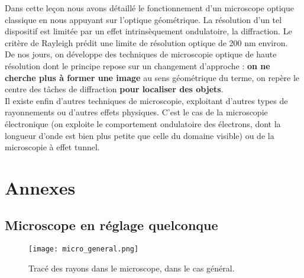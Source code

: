\documentclass[11pt,a4paper]{report}
\begin{document}
Dans cette leçon nous avons détaillé le fonctionnement d'un microscope optique classique en nous appuyant sur l'optique géométrique. La résolution d'un tel dispositif est limitée par un effet intrinsèquement ondulatoire, la diffraction. Le critère de Rayleigh prédit une limite de résolution optique de 200 nm environ.\\ 

De nos jours, on développe des techniques de microscopie optique de haute résolution dont le principe repose sur un changement d'approche : \textbf{on ne cherche plus à former une image} au sens géométrique du terme, on repère le centre des tâches de diffraction \textbf{pour localiser des objets}.\\

Il existe enfin d'autres techniques de microscopie, exploitant d'autres types de rayonnements ou d'autres effets physiques. C'est le cas de la microscopie électronique (on exploite le comportement ondulatoire des électrons, dont la longueur d'onde est bien plus petite que celle du domaine visible) ou de la microscopie à effet tunnel.

\newpage
\section*{Annexes}
\subsection*{Microscope en réglage quelconque}
\begin{figure}[h!]
	\begin{center}
   		\texttt{[image: micro\_general.png]}\\
	\end{center}
	\caption{Tracé des rayons dans le microscope, dans le cas général.}
\end{figure}
\end{document}
